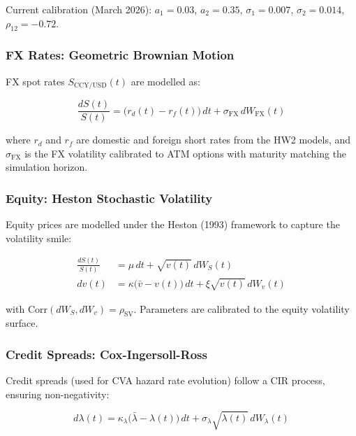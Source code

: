 \documentclass[11pt,a4paper]{article}
\begin{document}
Current calibration (March 2026):
$a_1 = 0.03$, $a_2 = 0.35$, $\sigma_1 = 0.007$, $\sigma_2 = 0.014$,
$\rho_{12} = -0.72$.

\subsubsection{FX Rates: Geometric Brownian Motion}

FX spot rates $S_{\text{CCY/USD}}(t)$ are modelled as:

\begin{equation}
  \frac{dS(t)}{S(t)} = \bigl(r_d(t) - r_f(t)\bigr)\, dt + \sigma_{\text{FX}}\, dW_{\text{FX}}(t)
  \label{eq:fx_gbm}
\end{equation}

where $r_d$ and $r_f$ are domestic and foreign short rates from the HW2 models,
and $\sigma_{\text{FX}}$ is the FX volatility calibrated to ATM options with
maturity matching the simulation horizon.

\subsubsection{Equity: Heston Stochastic Volatility}

Equity prices are modelled under the Heston (1993) framework to capture the
volatility smile:

\begin{align}
  \frac{dS(t)}{S(t)} &= \mu\, dt + \sqrt{v(t)}\, dW_S(t) \label{eq:heston_s}\\
  dv(t) &= \kappa\bigl(\bar{v} - v(t)\bigr)\, dt + \xi\sqrt{v(t)}\, dW_v(t) \label{eq:heston_v}
\end{align}

with $\text{Corr}(dW_S, dW_v) = \rho_{\text{SV}}$. Parameters are calibrated
to the equity volatility surface.

\subsubsection{Credit Spreads: Cox-Ingersoll-Ross}

Credit spreads (used for CVA hazard rate evolution) follow a CIR process,
ensuring non-negativity:

\begin{equation}
  d\lambda(t) = \kappa_\lambda\!\bigl(\bar{\lambda} - \lambda(t)\bigr)\, dt
               + \sigma_\lambda\sqrt{\lambda(t)}\, dW_\lambda(t)
  \label{eq:cir}
\end{equation}
\end{document}
